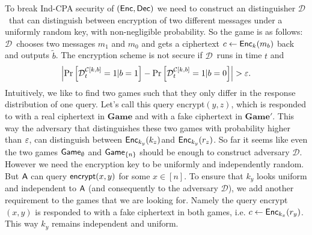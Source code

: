 \documentclass{article}
\def\A{{\sf A}}
\def\a {${\mathcal D}$}
\newcommand{\encrypt}{{\sf encrypt}}
\newcommand{\game}{{\sf Game}}
\newcommand{\dgame}{{\mathbf{Game}}}
\begin{document}
To break Ind-CPA security of $({\sf Enc},{\sf Dec})$ we need to construct an distinguisher \a~that can distinguish between encryption of two different messages under a uniformly random key, with non-negligible probability. So the game is as follows: \a~chooses two messages $m_1$ and $m_0$ and gets a ciphertext $c\leftarrow {\sf Enc}_k(m_b)$ back and outputs $\tilde{b}$. The encryption scheme is not secure if \a~runs in time $t$ and
\[\abs{\prob{{\mathcal D}_{t}^{\mathcal{C}[k,b]}=1|b=1}-\prob{{\mathcal D}_{t}^{\mathcal{C}[k,b]}=1|b=0}}>\eps.\]
Intuitively, we like to find two games such that they only differ in the response distribution of one query. Let's  call this query \encrypt$(y,z)$, which is responded to with a real ciphertext in $\dgame$ and with a fake ciphertext in $\dgame'$. This way the adversary that distinguishes these two games with probability higher than $\varepsilon$, can distinguish between ${\sf Enc}_{k_y}(k_z)$and ${\sf Enc}_{k_y}(r_z)$. So far it seems like even the two games $\game_{\emptyset}$ and $\game_{\cub{n}}$ should be enough to construct adversary \a. However we need the encryption key to be uniformly and independently random. But $\A$ can query $\encrypt(x,y)$ for some $x \in [n]$. To ensure that $k_y$ looks uniform and independent to $\A$ (and consequently to the adversary \a), we add another requirement to the games that we are looking for. Namely the query \encrypt$(x,y)$ is responded to with a fake ciphertext in both games, i.e. $c \leftarrow {\sf Enc}_{k_x}(r_y)$. This way $k_y$ remains independent and uniform. \\
\end{document}
